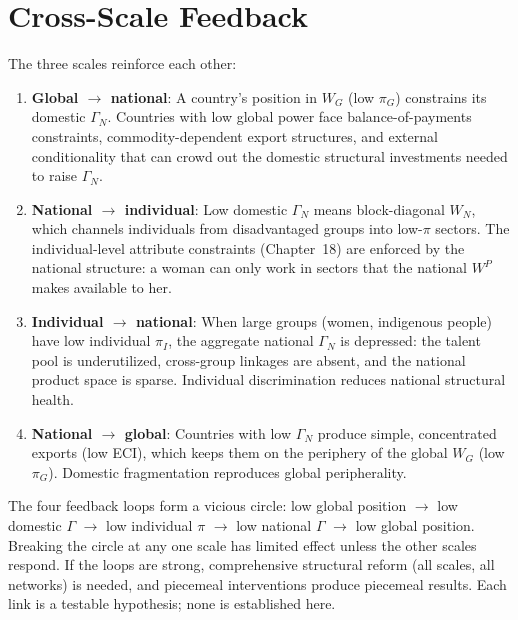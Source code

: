 \documentclass[../structural_economics_book.tex]{subfiles}
\begin{document}
\section{Cross-Scale Feedback}
\label{ch19:sec:feedback}

\begin{conjecture}\label{ch19:prop:cross_scale}
The three scales reinforce each other:
\begin{enumerate}
\item \textbf{Global $\to$ national}: A country's position in $W_G$ (low $\pi_G$) constrains its domestic $\Gamma_N$. Countries with low global power face balance-of-payments constraints, commodity-dependent export structures, and external conditionality that can crowd out the domestic structural investments needed to raise $\Gamma_N$.

\item \textbf{National $\to$ individual}: Low domestic $\Gamma_N$ means block-diagonal $W_N$, which channels individuals from disadvantaged groups into low-$\pi$ sectors. The individual-level attribute constraints (Chapter~18) are enforced by the national structure: a woman can only work in sectors that the national $W^P$ makes available to her.

\item \textbf{Individual $\to$ national}: When large groups (women, indigenous people) have low individual $\pi_I$, the aggregate national $\Gamma_N$ is depressed: the talent pool is underutilized, cross-group linkages are absent, and the national product space is sparse. Individual discrimination reduces national structural health.

\item \textbf{National $\to$ global}: Countries with low $\Gamma_N$ produce simple, concentrated exports (low ECI), which keeps them on the periphery of the global $W_G$ (low $\pi_G$). Domestic fragmentation reproduces global peripherality.
\end{enumerate}

The four feedback loops form a vicious circle: low global position $\to$ low domestic $\Gamma$ $\to$ low individual $\pi$ $\to$ low national $\Gamma$ $\to$ low global position. Breaking the circle at any one scale has limited effect unless the other scales respond. If the loops are strong, comprehensive structural reform (all scales, all networks) is needed, and piecemeal interventions produce piecemeal results. Each link is a testable hypothesis; none is established here.
\end{conjecture}
\end{document}
